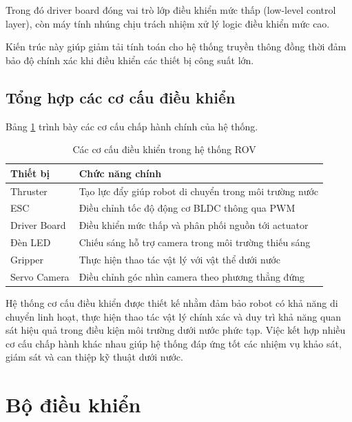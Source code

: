 \documentclass[../DoAn.tex]{subfiles}
\begin{document}
Trong đó driver board đóng vai trò lớp điều khiển mức thấp (low-level control layer), còn máy tính nhúng chịu trách nhiệm xử lý logic điều khiển mức cao.

Kiến trúc này giúp giảm tải tính toán cho hệ thống truyền thông đồng thời đảm bảo độ chính xác khi điều khiển các thiết bị công suất lớn.

\subsection{Tổng hợp các cơ cấu điều khiển}

Bảng \ref{tab:actuator_system} trình bày các cơ cấu chấp hành chính của hệ thống.

\begin{table}[H]
\centering
\caption{Các cơ cấu điều khiển trong hệ thống ROV}
\label{tab:actuator_system}
\begin{tabular}{|p{4cm}|p{9cm}|}
\hline
\textbf{Thiết bị} & \textbf{Chức năng chính} \\ \hline

Thruster &
Tạo lực đẩy giúp robot di chuyển trong môi trường nước \\ \hline

ESC &
Điều chỉnh tốc độ động cơ BLDC thông qua PWM \\ \hline

Driver Board &
Điều khiển mức thấp và phân phối nguồn tới actuator \\ \hline

Đèn LED &
Chiếu sáng hỗ trợ camera trong môi trường thiếu sáng \\ \hline

Gripper &
Thực hiện thao tác vật lý với vật thể dưới nước \\ \hline

Servo Camera &
Điều chỉnh góc nhìn camera theo phương thẳng đứng \\ \hline

\end{tabular}
\end{table}

Hệ thống cơ cấu điều khiển được thiết kế nhằm đảm bảo robot có khả năng di chuyển linh hoạt, thực hiện thao tác vật lý chính xác và duy trì khả năng quan sát hiệu quả trong điều kiện môi trường dưới nước phức tạp. Việc kết hợp nhiều cơ cấu chấp hành khác nhau giúp hệ thống đáp ứng tốt các nhiệm vụ khảo sát, giám sát và can thiệp kỹ thuật dưới nước.
\section{Bộ điều khiển}
\label{section:2.6}
\end{document}
